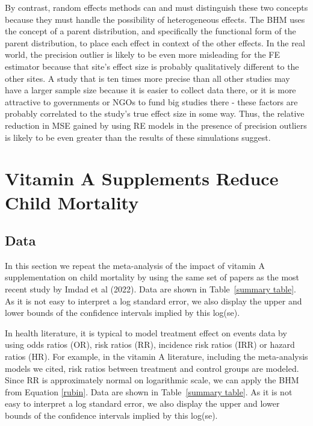 \documentclass[12pt]{article}
\begin{document}
By contrast, random effects methods can and must distinguish these two concepts because they must handle the possibility of heterogeneous effects. The BHM uses the concept of a parent distribution, and specifically the functional form of the parent distribution, to place each effect in context of the other effects. In the real world, the precision outlier is likely to be even more misleading for the FE estimator because that site's effect size is probably qualitatively different to the other sites. A study that is ten times more precise than all other studies may have a larger sample size because it is easier to collect data there, or it is more attractive to governments or NGOs to fund big studies there - these factors are probably correlated to the study's true effect size in some way. Thus, the relative reduction in MSE gained by using RE models in the presence of precision outliers is likely to be even greater than the results of these simulations suggest. 

\section{Vitamin A Supplements Reduce Child Mortality}

\subsection{Data}

In this section we repeat the meta-analysis of the impact of vitamin A supplementation on child mortality by using the same set of papers as the most recent study by Imdad et al (2022). Data are shown in Table~\ref{summary table}. 
As it is not easy to interpret a log standard error, we also display the upper and lower bounds of the confidence intervals implied by this log(se). 



In health literature, it is typical to model treatment effect on events data by using odds ratios (OR), risk ratios (RR), incidence risk ratios (IRR) or hazard ratios (HR). For example, in the vitamin A literature, including the meta-analysis models we cited, risk ratios between treatment and control groups are modeled. Since RR is approximately normal on logarithmic scale, we can apply the BHM from Equation \eqref{rubin}. Data are shown in Table~\ref{summary table}. As it is not easy to interpret a log standard error, we also display the upper and lower bounds of the confidence intervals implied by this log(se).
\end{document}
